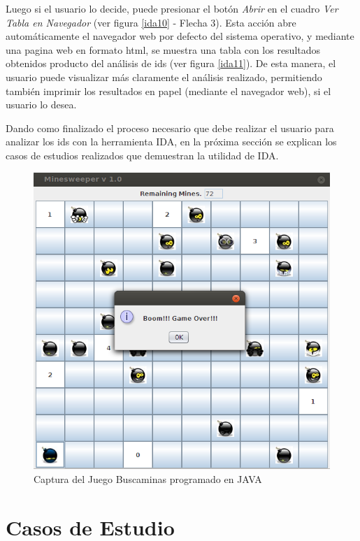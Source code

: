 Luego si el usuario lo decide, puede presionar el botón \textit{Abrir} en el cuadro \textit{Ver Tabla en Navegador} (ver figura \ref{ida10} - Flecha 3). Esta acción abre automáticamente el navegador web por defecto del sistema operativo, y mediante una pagina web en formato html, se muestra una tabla con los resultados obtenidos producto del análisis de ids (ver figura \ref{ida11}). De esta manera, el usuario puede visualizar más claramente el análisis realizado, permitiendo también imprimir los resultados en papel (mediante el navegador web), si el usuario lo desea.

Dando como finalizado el proceso necesario que debe realizar el usuario para analizar los ids con la herramienta IDA, en la próxima sección se explican los casos de estudios realizados que demuestran la utilidad de IDA.

\begin{figure}[h!] %
\centerline{%
\includegraphics[scale= 0.6]{./cap4/caso_01.png}
}
\caption{Captura del Juego Buscaminas programado en JAVA}
\label{caso1}
\end{figure}

\pagebreak

\section{Casos de Estudio}

